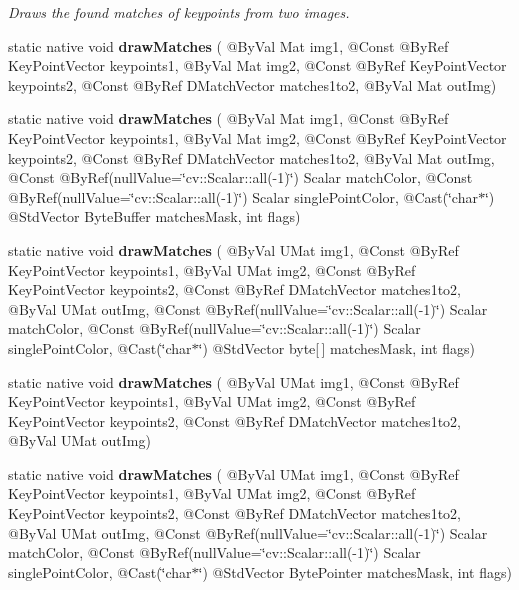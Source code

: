 \begin{DoxyCompactItemize}
\begin{DoxyCompactList}\small\item\em Draws the found matches of keypoints from two images. \end{DoxyCompactList}\item 
static native void {\bfseries draw\+Matches} ( @By\+Val Mat img1, @Const @By\+Ref Key\+Point\+Vector keypoints1, @By\+Val Mat img2, @Const @By\+Ref Key\+Point\+Vector keypoints2, @Const @By\+Ref D\+Match\+Vector matches1to2, @By\+Val Mat out\+Img)
\item 
static native void {\bfseries draw\+Matches} ( @By\+Val Mat img1, @Const @By\+Ref Key\+Point\+Vector keypoints1, @By\+Val Mat img2, @Const @By\+Ref Key\+Point\+Vector keypoints2, @Const @By\+Ref D\+Match\+Vector matches1to2, @By\+Val Mat out\+Img, @Const @By\+Ref(null\+Value=\char`\"{}cv\+::\+Scalar\+::all(-\/1)\char`\"{}) Scalar match\+Color, @Const @By\+Ref(null\+Value=\char`\"{}cv\+::\+Scalar\+::all(-\/1)\char`\"{}) Scalar single\+Point\+Color, @Cast(\char`\"{}char$\ast$\char`\"{}) @Std\+Vector Byte\+Buffer matches\+Mask, int flags)
\item 
static native void {\bfseries draw\+Matches} ( @By\+Val U\+Mat img1, @Const @By\+Ref Key\+Point\+Vector keypoints1, @By\+Val U\+Mat img2, @Const @By\+Ref Key\+Point\+Vector keypoints2, @Const @By\+Ref D\+Match\+Vector matches1to2, @By\+Val U\+Mat out\+Img, @Const @By\+Ref(null\+Value=\char`\"{}cv\+::\+Scalar\+::all(-\/1)\char`\"{}) Scalar match\+Color, @Const @By\+Ref(null\+Value=\char`\"{}cv\+::\+Scalar\+::all(-\/1)\char`\"{}) Scalar single\+Point\+Color, @Cast(\char`\"{}char$\ast$\char`\"{}) @Std\+Vector byte\mbox{[}$\,$\mbox{]} matches\+Mask, int flags)
\item 
static native void {\bfseries draw\+Matches} ( @By\+Val U\+Mat img1, @Const @By\+Ref Key\+Point\+Vector keypoints1, @By\+Val U\+Mat img2, @Const @By\+Ref Key\+Point\+Vector keypoints2, @Const @By\+Ref D\+Match\+Vector matches1to2, @By\+Val U\+Mat out\+Img)
\item 
static native void {\bfseries draw\+Matches} ( @By\+Val U\+Mat img1, @Const @By\+Ref Key\+Point\+Vector keypoints1, @By\+Val U\+Mat img2, @Const @By\+Ref Key\+Point\+Vector keypoints2, @Const @By\+Ref D\+Match\+Vector matches1to2, @By\+Val U\+Mat out\+Img, @Const @By\+Ref(null\+Value=\char`\"{}cv\+::\+Scalar\+::all(-\/1)\char`\"{}) Scalar match\+Color, @Const @By\+Ref(null\+Value=\char`\"{}cv\+::\+Scalar\+::all(-\/1)\char`\"{}) Scalar single\+Point\+Color, @Cast(\char`\"{}char$\ast$\char`\"{}) @Std\+Vector Byte\+Pointer matches\+Mask, int flags)

\end{DoxyCompactItemize}
